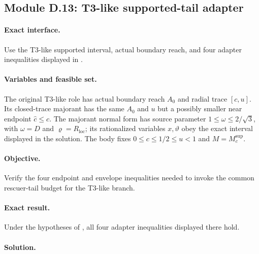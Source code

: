 \subsection{Module D.13: T3-like supported-tail adapter}

\paragraph{Exact interface.}
Use the T3-like supported interval, actual boundary reach, and four adapter
inequalities displayed in .

\paragraph{Variables and feasible set.}
The original T3-like role has actual boundary reach $A_0$ and radial trace
$[c,u]$.  Its closed-trace majorant has the same $A_0$ and $u$ but a possibly
smaller near endpoint $\widehat c\le c$.  The majorant normal form has source
parameter $1\le\omega\le2/\sqrt3$, with $\omega=D$ and
$\varrho=R_{\mathrm{loc}}$; its rationalized variables $x,\vartheta$ obey
the exact interval displayed in the solution.  The body fixes
$0\le c\le1/2\le u<1$ and $M=M_c^{\mathrm{sup}}$.

\paragraph{Objective.}
Verify the four endpoint and envelope inequalities needed to invoke the
common rescuer-tail budget for the T3-like branch.

\paragraph{Exact result.}

\begin{lemma}
\label{lem:app-t3-supported-adapter}
Under the hypotheses of , all four adapter
inequalities displayed there hold.
\end{lemma}

\paragraph{Solution.}

